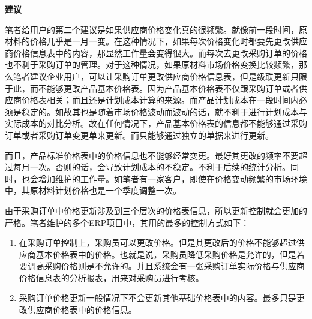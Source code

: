     \textbf {建议}

    笔者给用户的第二个建议是如果供应商价格变化真的很频繁。就像前一段时间，原材料的价格几乎是一月一变。在这种情况下，如果每次价格变化时都要先更改供应商价格信息表中的内容，那显然工作量会变得很大。而每次去更改采购订单的价格也不利于采购订单的管理。对于这种情况，如果原材料市场价格变换比较频繁，那么笔者建议企业用户，可以让采购订单更改供应商价格信息表，但是级联更新只限于此，而不能够更改产品基本价格表。因为产品基本价格表不仅跟采购订单或者供应商价格表相关；而且还是计划成本计算的来源。而产品计划成本在一段时间内必须是稳定的。如故其也是随着市场价格波动而波动的话，就不利于进行计划成本与实际成本的对比分析。故在任何情况下，产品基本价格表的信息都不能够通过采购订单或者采购订单变更单来更新。而只能够通过独立的单据来进行更新。

    而且，产品标准价格表中的价格信息也不能够经常变更。最好其更改的频率不要超过每月一次。否则的话，会导致计划成本的不稳定。不利于后续的统计分析。同时，也会增加维护的工作量。如笔者有一家客户，即使在价格变动频繁的市场环境中，其原材料计划价格也是一个季度调整一次。

    由于采购订单中价格更新涉及到三个层次的价格表信息，所以更新控制就会更加的严格。笔者维护的多个ERP项目中，其用的最多的控制方式如下：

    \begin{enumerate}
        \item  在采购订单控制上，采购员可以更改价格。但是其更改后的价格不能够超过供应商基本价格表中的价格。也就是说，采购员降低采购价格是允许的，但是若要调高采购价格则是不允许的。并且系统会有一张采购订单实际价格与供应商价格信息表的分析报表，用来对采购员进行考核。

        \item  采购订单价格更新一般情况下不会更新其他基础价格表中的内容。最多只是更改供应商价格表中的价格信息。
    \end{enumerate}
